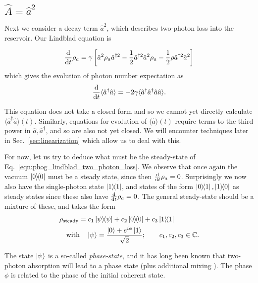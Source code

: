 \clearpage
\subsection{$\hat{A} = \hat{a}^2$}\label{sec:A_aa}
Next we consider a decay term $\hat{a}^2$, which describes two-photon loss into the reservoir. Our Lindblad equation is

\begin{equation}\label{eqn:phog_lindblad_two_photon_loss}
\frac{\mathrm{d}}{\mathrm{d}t} \rho_a = \gamma\left[\hat{a}^2 \rho_a \hat{a}^{\dagger 2} - \frac{1}{2} \hat{a}^{\dagger 2} \hat{a}^2 \rho_a - \frac{1}{2} \rho \hat{a}^{\dagger 2} \hat{a}^2\right]
\end{equation}
which gives the evolution of photon number expectation as 
\begin{equation}\label{eqn:aa_not_closed}
\frac{\mathrm{d}}{\mathrm{d}t} \langle \hat{a}^\dagger \hat{a}\rangle = - 2 \gamma \langle \hat{a}^\dagger \hat{a}^\dagger \hat{a}\hat{a}\rangle.
\end{equation}

\noindent This equation does not take a closed form and so we cannot yet directly calculate $\langle \hat{a}^\dagger \hat{a}\rangle\left(t\right)$. Similarly, equations for evolution of $\langle\hat{a}\rangle\left(t\right)$ require terms to the third power in $\hat{a}, \hat{a}^\dagger$, and so are also not yet closed.  We will encounter techniques later in Sec.~\ref{sec:linearization} which allow us to deal with this.

For now, let us try to deduce what must be the steady-state of Eq.~\ref{eqn:phog_lindblad_two_photon_loss}. We observe that once again the vacuum $\dyad{0}$ must be a steady state, since then $\frac{\mathrm{d}}{\mathrm{d}t} \rho_a=0$. Surprisingly we now also have the single-photon state $\dyad{1}$, and states of the form $\dyad{0}{1}, \dyad{1}{0}$ as steady states since these also have $\frac{\mathrm{d}}{\mathrm{d}t} \rho_a=0$. The general steady-state should be a mixture of these, and takes the form
\begin{align}\label{eqn:phog_phase_state}
&\rho_{\text{steady}} = c_1 \dyad{\psi} + c_2 \dyad{0} + c_3 \dyad{1} \notag \\
%
&\qq{with} \ket{\psi} = \frac{\ket{0} + e^{i \phi} \ket{1}}{\sqrt{2}};  \qq{} c_1, c_2, c_3 \in \mathbb{C}.
\end{align}

\noindent The state $\ket{\psi}$ is a so-called \emph{phase-state}, and it has long been known that two-photon absorption will lead to a phase state \cite{Ezaki1999} (plus additional mixing \cite{Alexanian2000, *Ezaki2000}). The phase $\phi$ is related to the phase of the initial coherent state. 

